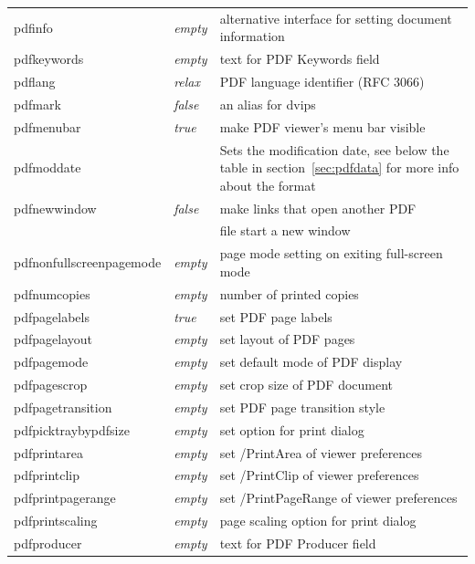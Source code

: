 \documentclass{article}
\begin{document}
\begin{longtable}{@{}>{\ttfamily}llp{7cm}@{}}
pdfinfo            & \textit{empty}         & alternative interface for setting document information\\
pdfkeywords        & \textit{empty}         & text for PDF Keywords field \\
pdflang            & \textit{relax}         & PDF language identifier (RFC 3066) \\
pdfmark            & \textit{false}         & an alias for \textsf{dvips} \\
pdfmenubar         & \textit{true}          & make PDF viewer's menu bar visible \\
pdfmoddate    &                        & Sets the modification date, see below the table in section~\ref{sec:pdfdata} for more info about the format\\
pdfnewwindow       & \textit{false}         & make links that open another PDF \\
                   &                        & file start a new window \\
pdfnonfullscreenpagemode
                   & \textit{empty}         & page mode setting on exiting
                                              full-screen mode\\
pdfnumcopies       & \textit{empty}         & number of printed copies\\
pdfpagelabels      & \textit{true}          & set PDF page labels \\
pdfpagelayout      & \textit{empty}         & set layout of PDF pages \\
pdfpagemode        & \textit{empty}         & set default mode of PDF display \\
pdfpagescrop       & \textit{empty}         & set crop size of PDF document \\
pdfpagetransition  & \textit{empty}         & set PDF page transition style \\
pdfpicktraybypdfsize
                   & \textit{empty}         & set option for print dialog \\
pdfprintarea       & \textit{empty}         & set /PrintArea of viewer preferences \\
pdfprintclip       & \textit{empty}         & set /PrintClip of viewer preferences \\
pdfprintpagerange  & \textit{empty}         & set /PrintPageRange of viewer preferences \\
pdfprintscaling    & \textit{empty}         & page scaling option for print dialog \\
pdfproducer        & \textit{empty}         & text for PDF Producer field \\

\end{longtable}
\end{document}
